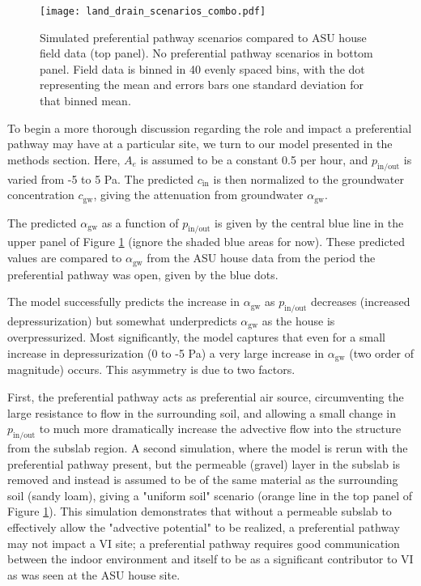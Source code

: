 \documentclass[journal=esthag,manuscript=article]{achemso}
\begin{document}
\begin{figure}[htb!]
	\centering
  \caption{Simulated preferential pathway scenarios compared to ASU house field data (top panel). No preferential pathway scenarios in bottom panel. Field data is binned in 40 evenly spaced bins, with the dot representing the mean and errors bars one standard deviation for that binned mean.}
  \label{fig:land_drain_scenarios}
  \texttt{[image: land\_drain\_scenarios\_combo.pdf]}
\end{figure}

To begin a more thorough discussion regarding the role and impact a preferential pathway may have at a particular site, we turn to our model presented in the methods section.
Here, $A_e$ is assumed to be a constant 0.5 per hour, and $p_\mathrm{in/out}$ is varied from -5 to 5 Pa.
The predicted $c_\mathrm{in}$ is then normalized to the groundwater concentration $c_\mathrm{gw}$, giving the attenuation from groundwater $\alpha_\mathrm{gw}$.

The predicted $\alpha_\mathrm{gw}$ as a function of $p_\mathrm{in/out}$ is given by the central blue line in the upper panel of Figure \ref{fig:land_drain_scenarios} (ignore the shaded blue areas for now).
These predicted values are compared to $\alpha_\mathrm{gw}$ from the ASU house data from the period the preferential pathway was open, given by the blue dots.

The model successfully predicts the increase in $\alpha_\mathrm{gw}$ as $p_\mathrm{in/out}$ decreases (increased depressurization) but somewhat underpredicts $\alpha_\mathrm{gw}$ as the house is overpressurized.
Most significantly, the model captures that even for a small increase in depressurization (0 to -5 Pa) a very large increase in $\alpha_\mathrm{gw}$ (two order of magnitude) occurs.
This asymmetry is due to two factors.

First, the preferential pathway acts as preferential air source, circumventing the large resistance to flow in the surrounding soil, and allowing a small change in $p_\mathrm{in/out}$ to much more dramatically increase the advective flow into the structure from the subslab region.
A second simulation, where the model is rerun with the preferential pathway present, but the permeable (gravel) layer in the subslab is removed and instead is assumed to be of the same material as the surrounding soil (sandy loam), giving a "uniform soil" scenario (orange line in the top panel of Figure \ref{fig:land_drain_scenarios}).
This simulation demonstrates that without a permeable subslab to effectively allow the "advective potential" to be realized, a preferential pathway may not impact a VI site; a preferential pathway requires good communication between the indoor environment and itself to be as a significant contributor to VI as was seen at the ASU house site.
\end{document}
